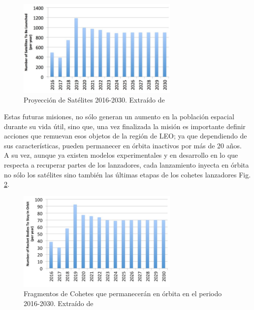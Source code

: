 \begin{figure}[!h]
  \centering
  \includegraphics[width=0.7\textwidth]{imagenes/satelxlanz}
  \caption[Proyecci\'on de Sat\'elites 2016-2030]{Proyecci\'on de Sat\'elites 2016-2030. Extra\'ido de \citep{karacalioglu2016impact}}
  \label{fig:satxlanz}
\end{figure}

Estas futuras misiones, no s\'olo generan un aumento en la poblaci\'on espacial durante su vida \'util, sino que, una vez finalizada la misi\'on es importante definir acciones que remuevan esos objetos de la regi\'on de LEO; ya que dependiendo de sus caracter\'isticas, pueden permanecer en \'orbita inactivos por m\'as de 20 a\~nos.\\
A su vez, aunque ya existen modelos experimentales y en desarrollo en lo que respecta a recuperar partes de los lanzadores, cada lanzamiento inyecta en \'orbita no s\'olo los sat\'elites sino tambi\'en las \'ultimas etapas de los cohetes lanzadores Fig. \ref{fig:rocketbodies}.\\

\begin{figure}[!h]
  \centering
  \includegraphics[width=0.7\textwidth]{imagenes/rocketbodies}
  \caption[Fragmentos de Cohetes 2016-2030]{Fragmentos de Cohetes que permanecer\'an en \'orbita en el periodo 2016-2030. Extra\'ido de \cite{karacalioglu2016impact}}
  \label{fig:rocketbodies}
\end{figure}

